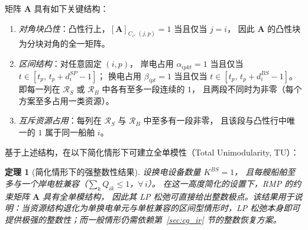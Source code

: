 \documentclass[UTF8, a4paper, 12pt]{ctexart}
\theoremstyle{plain}
\newtheorem{theorem}{定理}
\theoremstyle{definition}
\theoremstyle{remark}
\begin{document}
矩阵 $\mathbf{A}$ 具有如下关键结构：
\begin{enumerate}[label=(\roman*)]
  \item \emph{对角块凸性}：凸性行上，$[\mathbf{A}]_{C_i,\,(j,p)}=1$ 当且仅当 $j=i$，
        因此 $\mathbf{A}$ 的凸性块为分块对角的全一矩阵。
  \item \emph{区间结构}：对任意固定 $(i,p)$，
        岸电占用 $\alpha_{ipkt}=1$ 当且仅当 $t\in[t_p,\,t_p+d_i^{SP}-1]$；
        换电占用 $\beta_{ipt}=1$ 当且仅当 $t\in[t_p,\,t_p+d_i^{BS}-1]$。
        即每一列在 $\mathcal{R}_S$ 或 $\mathcal{R}_B$ 中各有至多一段连续的 $1$，
        且两段不同时为非零（每个方案至多占用一类资源）。
  \item \emph{互斥资源占用}：每列在 $\mathcal{R}_S$ 与 $\mathcal{R}_B$ 中至多有一段非零，
        且该段与凸性行中唯一的 $1$ 属于同一船舶 $i$。
\end{enumerate}

基于上述结构，在以下简化情形下可建立全单模性（Total Unimodularity, TU）：

\begin{theorem}[简化情形下的强整数性结果]
\label{thm:tu}
设换电设备数量 $K^{BS}=1$，
且每艘船舶至多与一个岸电桩兼容（$\sum_{k}Q_{ik}\le 1$，$\forall\,i$）。
在这一高度简化的设置下，RMP 的约束矩阵 $\mathbf{A}$ 具有全单模结构，
因此其 LP 松弛可直接给出整数极点。该结果用于说明：当资源结构退化为单换电单元与单桩兼容的区间型情形时，LP 松弛本身即可提供极强的整数性；而一般情形仍需依赖第~\ref{sec:cg_ir} 节的整数恢复方案。
\end{theorem}
\end{document}
